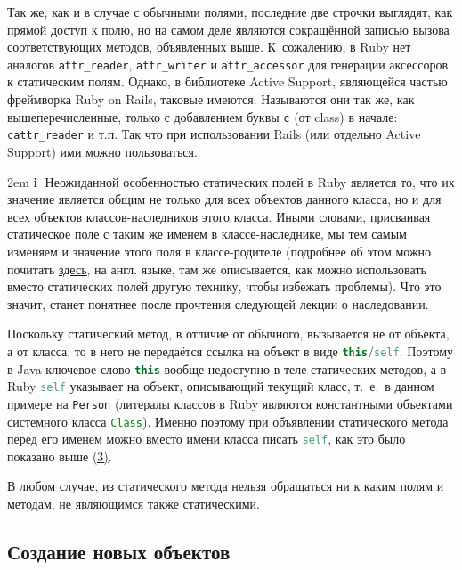 \documentclass[a4paper, 14pt, titlepage]{extarticle}
\newcommand{\ie}{т.~е.~}
\newenvironment{indented}%
    { \begingroup %
        \noindent %
        \leftskip2em %
        \rightskip\leftskip }%
    { \par\endgroup }
\newenvironment{extrainfo}%
    { \begin{indented} %
        \color{dkblue} %
        \small %
        \textbf{\textcircled{\footnotesize i}} }%
    { \end{indented} }
\newcommand{\inlinecode}[2][Java]{\lstinline[basicstyle=\ttfamily, language=#1]{#2}}
\begin{document}
  Так же, как и в случае с обычными полями, последние две строчки выглядят, как прямой доступ к полю,
  но на самом деле являются сокращённой записью вызова соответствующих методов, объявленных выше.
  К~сожалению, в Ruby нет аналогов \inlinecode{attr_reader}, \inlinecode{attr_writer} и
  \inlinecode{attr_accessor} для генерации аксессоров к статическим полям. Однако, в
  библиотеке Active Support, являющейся частью фреймворка Ruby on Rails, таковые имеются. Называются
  они так же, как вышеперечисленные, только с добавлением буквы \inlinecode{c} (от class) в начале:
  \inlinecode{cattr_reader} и т.п. Так что при использовании Rails (или отдельно Active Support) ими
  можно пользоваться.

  \begin{extrainfo}
    Неожиданной особенностью статических полей в Ruby является то, что их значение является общим
    не только для всех объектов данного класса, но и для всех объектов классов-наследников этого
    класса. Иными словами, присваивая статическое поле с таким же именем в классе-наследнике, мы
    тем самым изменяем и значение этого поля в классе-родителе (подробнее об этом можно почитать
    \href{http://apidock.com/rails/Class/cattr_accessor#624-Important-note}{\uline{здесь}}, на англ.
    языке, там же описывается, как можно использовать вместо статических полей другую технику, чтобы
    избежать проблемы). Что это значит, станет понятнее после прочтения следующей лекции о наследовании.
  \end{extrainfo}

  Поскольку статический метод, в отличие от обычного, вызывается не от объекта, а от класса, то в
  него не передаётся ссылка на объект в виде \inlinecode[Java]{this}/\inlinecode[Ruby]{self}.
  Поэтому в Java ключевое слово \inlinecode[Java]{this} вообще недоступно в теле статических методов,
  а в Ruby \inlinecode[Ruby]{self} указывает на объект, описывающий текущий класс, \ie в данном
  примере на \inlinecode{Person} (литералы классов в Ruby являются константными объектами системного
  класса \inlinecode{Class}). Именно поэтому при объявлении статического метода перед его именем
  можно вместо имени класса писать \inlinecode[Ruby]{self}, как это было показано выше \hyperref[lst:static_self]{(3)}.

  В любом случае, из статического метода нельзя обращаться ни к каким полям и методам, не являющимся
  также статическими.

  \subsection{Создание новых объектов}
\end{document}

